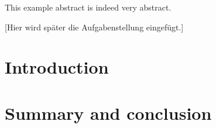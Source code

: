 \documentclass[11pt,twoside]{scrbook}
\begin{document}
This example abstract is indeed very abstract.

\cleardoublepage

\vspace*{7cm}
\centerline{[Hier wird später die Aufgabenstellung eingefügt.]}

\tableofcontents
\cleardoublepage
\listoffigures
\cleardoublepage
\listoftables
\cleardoublepage


\setcounter{page}{0}

\pagestyle{headings}

\chapter{Introduction}

\cleardoublepage

%

%

\chapter{Summary and conclusion}
\cleardoublepage




\begin{appendix}


\end{appendix}
\end{document}
